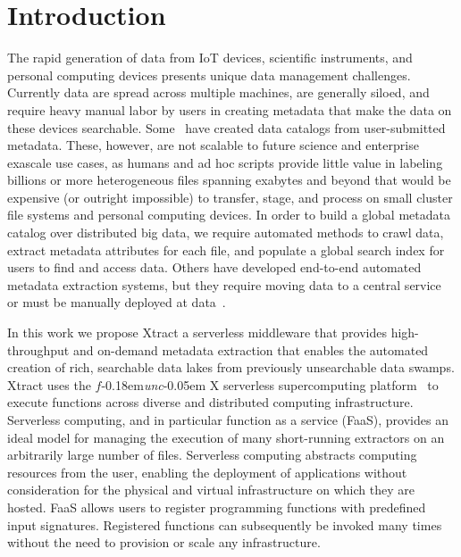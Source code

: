 \documentclass[sigconf, 9pt]{acmart}
\newcommand{\tyler}[1]{}
\newcommand{\tyler}[1]{{\textcolor{cyan}{ tyler: #1 }}}
\newcommand{\name}{Xtract}
\newcommand{\funcx}{$f$\kern-0.18em\emph{unc}\kern-0.05em X}
\begin{document}


\maketitle


\section{Introduction}

The rapid generation of data from IoT devices, scientific instruments, and personal computing devices presents unique 
data management challenges. Currently data are spread across multiple machines, are generally siloed, and require 
heavy manual labor by users in creating metadata that make the data on these devices searchable. Some~\cite{egan2003vizier, welter2013nhgri, irods, dataverse}  have created data catalogs from user-submitted metadata. These, however, are not scalable to future science and enterprise 
exascale use cases, as humans and ad hoc scripts provide little value in labeling billions or more heterogeneous files spanning exabytes and beyond
that would be expensive (or outright impossible) to transfer, stage, and process on small cluster file systems and personal computing devices.  
In order to build a global metadata catalog over distributed big data, we require automated methods to crawl data, extract 
metadata attributes for each file, and populate a global search index for users to find and access data. Others have developed end-to-end 
automated metadata extraction systems, but they require moving data to a central service~\cite{skluzacek2018skluma, skluzacek2016klimatic, padhy2015brown, rodrigo2018sciencesearch} or must be manually deployed at data~\cite{mattmann2011tika}. 

\tyler{un-plagiarize the serverless sentences}
In this work we propose \name{}
a serverless middleware that provides high-throughput and on-demand metadata 
extraction that enables the automated creation of rich, searchable data lakes from previously unsearchable data swamps. 
\name{} uses the \funcx{} serverless supercomputing platform~\cite{chard2019serverless}
to execute functions across diverse and distributed computing infrastructure.
Serverless computing, and in particular function as a service (FaaS),
provides an ideal model for managing the execution of
many short-running extractors on an arbitrarily large number of files. 
Serverless computing abstracts computing resources from the user, enabling
the deployment of applications without consideration for the physical and virtual infrastructure on which 
they are hosted. FaaS allows users to register programming functions with predefined input signatures.
Registered functions can subsequently be invoked many times
without the need to provision or scale any infrastructure.
\end{document}
